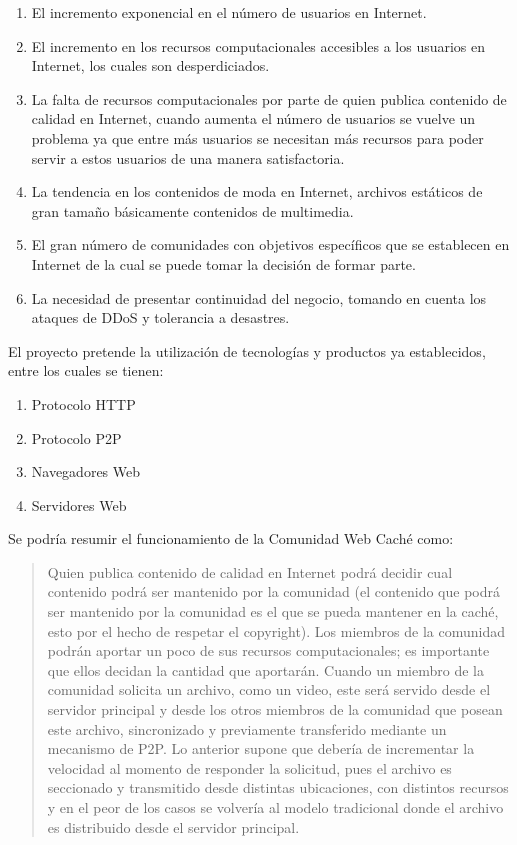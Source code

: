 \begin{enumerate}
\item El incremento exponencial en el número de usuarios en Internet.
\item El incremento en los recursos computacionales accesibles a los usuarios en Internet, los cuales son desperdiciados. 
\item La falta de recursos computacionales por parte de quien publica contenido de calidad en Internet, cuando aumenta el número de usuarios se vuelve un problema ya que entre más usuarios se necesitan más recursos para poder servir a estos usuarios de una manera satisfactoria.
\item La tendencia en los contenidos de moda en Internet, archivos estáticos de gran tamaño básicamente contenidos de multimedia.
\item El gran número de comunidades con objetivos específicos que se establecen en Internet de la cual se puede tomar la decisión de formar parte.
\item La necesidad de presentar continuidad del negocio, tomando en cuenta los ataques de DDoS y tolerancia a desastres. 
\end{enumerate}
  
 
El proyecto pretende la utilización de tecnologías y productos ya establecidos, entre los cuales se tienen:

\begin{enumerate}
\item Protocolo HTTP
\item Protocolo P2P
\item Navegadores Web
\item Servidores Web
\end{enumerate}

Se podría resumir el funcionamiento de la Comunidad Web Caché como:
\begin{verse}
Quien publica contenido de calidad en Internet podrá decidir cual contenido podrá ser mantenido por la comunidad (el contenido que podrá ser mantenido por la comunidad es el que se pueda mantener en la caché, esto por el hecho de respetar el copyright). Los miembros de la comunidad podrán aportar un poco de sus recursos computacionales; es importante que ellos decidan la cantidad que aportarán. Cuando un miembro de la comunidad solicita un archivo, como un video, este será servido desde el servidor principal y desde los otros miembros de la comunidad que posean este archivo, sincronizado y previamente transferido mediante un mecanismo de P2P. Lo anterior supone que debería de incrementar la velocidad al momento de responder la solicitud, pues el archivo es seccionado y transmitido desde distintas ubicaciones, con distintos recursos y en el peor de los casos se volvería al modelo tradicional donde el archivo es distribuido desde el servidor principal. 
\end{verse}

